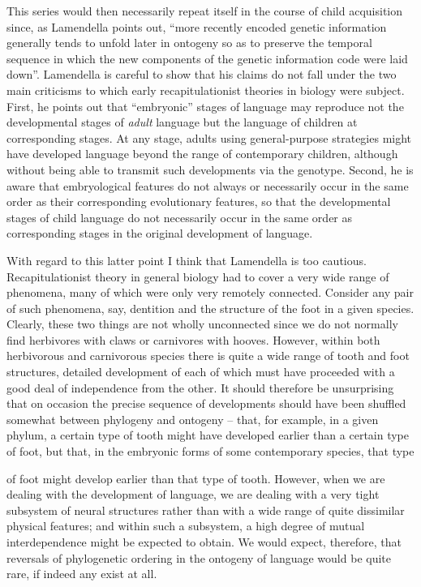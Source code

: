 This series would then necessarily repeat itself in the course of child acquisition since, as Lamendella points out, ``more recently encoded genetic information generally tends to unfold later in ontogeny so as to preserve the temporal sequence in which the new components of the genetic information code were laid down''. Lamendella is careful to show that his claims do not fall under the two main criticisms to which early recapitulationist theories in biology were subject. First, he points out that ``embryonic'' stages of language may reproduce not the developmental stages of \textit{adult} language but the language of children at corresponding stages. At any stage, adults using general-purpose strategies might have developed language beyond the range of contemporary children, although without being able to transmit such developments via the genotype. Second, he is aware that embryological features do not always or necessarily occur in the same order as their corresponding evolutionary features, so that the developmental stages of child language do not necessarily occur in the same order as corre\-sponding stages in the original development of language.

With regard to this latter point I think that Lamendella is too cautious. Recapitulationist theory in general biology had to cover a very wide range of phenomena, many of which were only very re\-motely connected. Consider any pair of such phenomena, say, dentition and the structure of the foot in a given species. Clearly, these two things are not wholly unconnected since we do not normally find herbivores with claws or carnivores with hooves. However, within both herbivorous and carnivorous species there is quite a wide range of tooth and foot structures, detailed development of each of which must have proceeded with a good deal of independence from the other. It should therefore be unsurprising that on occasion the precise sequence of developments should have been shuffled somewhat between phylogeny and ontogeny -- that, for example, in a given phylum, a certain type of tooth might have developed earlier than a certain type of foot, but that, in the embryonic forms of some contemporary species, that type


of foot might develop earlier than that type of tooth. However, when we are dealing with the development of language, we are dealing with a very tight subsystem of neural structures rather than with a wide range of quite dissimilar physical features; and within such a sub\-system, a high degree of mutual interdependence might be expected to obtain. We would expect, therefore, that reversals of phylogenetic ordering in the ontogeny of language would be quite rare, if indeed any exist at all.

